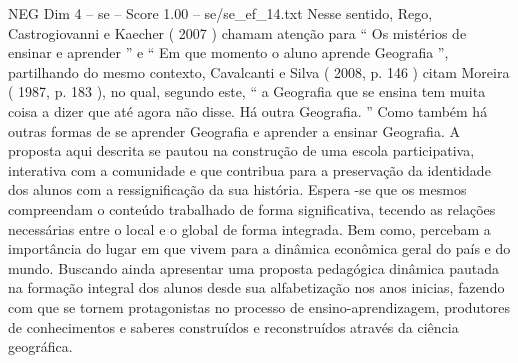 \begin{textsample}{NEG Dim 4 – se – Score 1.00 – se/se\_ef\_14.txt}
Nesse sentido, Rego, Castrogiovanni e Kaecher ( 2007 ) chamam atenção para “ Os mistérios de ensinar e aprender ” e “ Em que momento o aluno aprende Geografia ”, partilhando do mesmo contexto, Cavalcanti e Silva ( 2008, p. 146 ) citam Moreira ( 1987, p. 183 ), no qual, segundo este, “ a Geografia que se ensina tem muita coisa a dizer que até agora não disse.
Há outra Geografia. ” Como também há outras formas de se aprender Geografia e aprender a ensinar Geografia.
A proposta aqui descrita se pautou na construção de uma escola participativa, interativa com a comunidade e que contribua para a preservação da identidade dos alunos com a ressignificação da sua história.
Espera -se que os mesmos compreendam o conteúdo trabalhado de forma significativa, tecendo as relações necessárias entre o local e o global de forma integrada.
Bem como, percebam a importância do lugar em que vivem para a dinâmica econômica geral do país e do mundo.
Buscando ainda apresentar uma proposta pedagógica dinâmica pautada na formação integral dos alunos desde sua alfabetização nos anos inicias, fazendo com que se tornem protagonistas no processo de ensino-aprendizagem, produtores de conhecimentos e saberes construídos e reconstruídos através da ciência geográfica.

\end{textsample}
